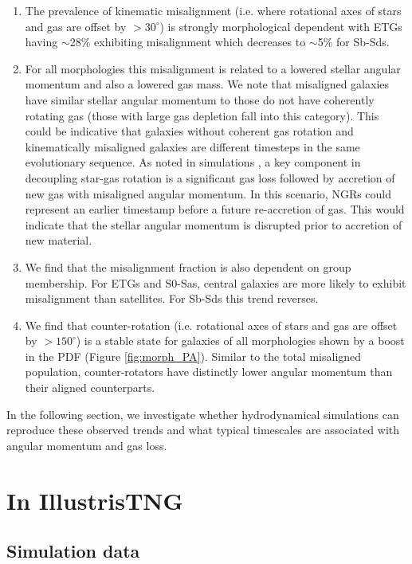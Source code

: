 \begin{enumerate}
    \item The prevalence of kinematic misalignment (i.e. where rotational axes of stars and gas are offset by $> 30^{\circ}$) is strongly morphological dependent with ETGs having $\sim$28\% exhibiting misalignment which decreases to $\sim$5\% for Sb-Sds.
    
    \item For all morphologies this misalignment is related to a lowered stellar angular momentum and also a lowered gas mass. We note that misaligned galaxies have similar stellar angular momentum to those do not have coherently rotating gas (those with large gas depletion fall into this category). This could be indicative that galaxies without coherent gas rotation and kinematically misaligned galaxies are different timesteps in the same evolutionary sequence. As noted in simulations \citep[][]{vdvoort2015, starkenburg+19}, a key component in decoupling star-gas rotation is a significant gas loss followed by accretion of new gas with misaligned angular momentum. In this scenario, NGRs could represent an earlier timestamp before a future re-accretion of gas. This would indicate that the stellar angular momentum is disrupted prior to accretion of new material. 
    
    \item We find that the misalignment fraction is also dependent on group membership. For ETGs and S0-Sas, central galaxies are more likely to exhibit misalignment than satellites. For Sb-Sds this trend reverses.
    
    \item We find that counter-rotation (i.e. rotational axes of stars and gas are offset by $> 150^{\circ}$) is a stable state for galaxies of all morphologies shown by a boost in the PDF (Figure \ref{fig:morph_PA}). Similar to the total misaligned population, counter-rotators have distinctly lower angular momentum than their aligned counterparts. 

\end{enumerate}
In the following section, we investigate whether hydrodynamical simulations can reproduce these observed trends and what typical timescales are associated with angular momentum and gas loss.

\section{In IllustrisTNG} \label{sec:tng_kin_mis}
\subsection{Simulation data} \label{sec:sim_data_TNG}
